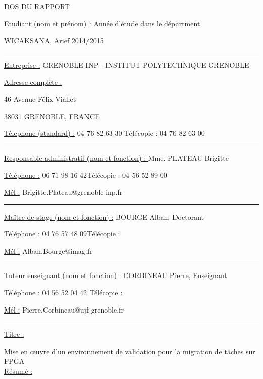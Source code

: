 \thispagestyle{empty}
\SingleSpacing
\centering
\begin{bfseries}
DOS DU RAPPORT

\begin{itshape}
\justify
\setlength{\parindent}{0pt}
\underline{Etudiant (nom et pr\'enom) :} \hfill Ann\'ee d'\'etude dans le d\'epartment

WICAKSANA, Arief \hfill 2014/2015

\rule{\textwidth}{1pt}

\underline{Entreprise :} GRENOBLE INP - INSTITUT POLYTECHNIQUE GRENOBLE

\underline{Adresse compl\`ete :}

46 Avenue F\'elix Viallet

38031 GRENOBLE, FRANCE 

\underline{T\'elephone (standard) :} 04 76 82 63 30 \hfill T\'el\'ecopie : 04 76 82 63 00

\rule{\textwidth}{1pt}

\underline{Responsable administratif (nom et fonction) : } Mme. PLATEAU Brigitte

\underline{T\'el\'ephone :} 06 71 98 16 42\hfill T\'el\'ecopie : 04 56 52 89 00

\underline{M\'el :} Brigitte.Plateau@grenoble-inp.fr

\rule{\textwidth}{1pt}

\underline{Ma\^itre de stage (nom et fonction) :} BOURGE Alban, Doctorant

\underline{T\'el\'ephone :} 04 76 57 48 09\hfill T\'el\'ecopie :  \hspace{26 mm}

\underline{M\'el :} Alban.Bourge@imag.fr

\rule{\textwidth}{1pt}

\underline{Tuteur enseignant (nom et fonction) :} CORBINEAU Pierre, Enseignant

\underline{T\'el\'ephone :} 04 56 52 04 42  \hfill T\'el\'ecopie : \hspace{26 mm}

\underline{M\'el :} Pierre.Corbineau@ujf-grenoble.fr

\rule{\textwidth}{1pt}

\underline{Titre :}

Mise en \oe uvre d'un environnement de validation pour la migration de t\^aches sur FPGA \\

\underline{R\'esum\'e :}


\end{itshape}
\end{bfseries}